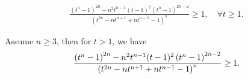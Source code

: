 \documentclass[10pt,a4paper]{amsart}
\begin{document}
\begin{lemma} \label{L2}
        \begin{align} \label{keyinequality}
\frac{\left(t^n-1\right)^{2 n}-n^2 t^{n-1}(t-1)^2\left(t^n-1\right)^{2 n-2}}{\left(t^{2 n}-n t^{n+1}+n t^{n-1}-1\right)^n} \geq 1, \quad \forall t\geq 1.
\end{align}
\end{lemma}

\begin{lemma} 
Assume $n\geq 3$, then for $t>1$, we have 
\begin{align} \notag 
\frac{\left(t^n-1\right)^{2 n}-n^2 t^{n-1}(t-1)^2\left(t^n-1\right)^{2 n-2}}{\left(t^{2 n}-n t^{n+1}+n t^{n-1}-1\right)^n} \geq 1.
\end{align}
\end{lemma}
\end{document}

